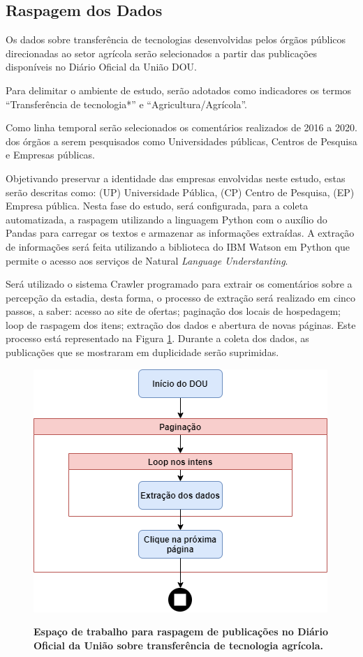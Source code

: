 \subsection{Raspagem dos Dados}

Os dados sobre transferência de tecnologias desenvolvidas pelos órgãos públicos direcionadas ao setor agrícola serão selecionados a partir das publicações disponíveis no Diário Oficial da União DOU.

Para delimitar o ambiente de estudo, serão adotados como indicadores os termos “Transferência de tecnologia*” e “Agricultura/Agrícola”. 

Como linha temporal serão selecionados os comentários realizados de 2016 a 2020. dos órgãos a serem pesquisados como Universidades públicas, Centros de Pesquisa e Empresas públicas.

Objetivando preservar a identidade das empresas envolvidas neste estudo, estas serão descritas como: (UP) Universidade Pública, (CP) Centro de Pesquisa, (EP) Empresa pública. Nesta fase do  estudo, será configurada, para a coleta automatizada, a raspagem utilizando a linguagem Python com o auxílio do Pandas para carregar os textos e armazenar as informações extraídas. A extração de informações será feita utilizando a biblioteca do IBM Watson em Python que permite o acesso aos serviços de Natural \textit{Language Understanting}.

Será utilizado o sistema Crawler programado para extrair os comentários sobre a percepção da estadia, desta forma, o processo de extração será realizado em cinco passos, a saber: acesso ao site de ofertas; paginação dos locais de hospedagem; loop de raspagem dos itens; extração dos dados e abertura de novas páginas. Este processo está representado  na Figura \ref{figura_raspagem}. Durante a coleta dos dados, as publicações que se mostraram em duplicidade serão suprimidas. 



\begin{figure}[H]
\centering
\caption{\textbf{Espaço de trabalho para raspagem de publicações no Diário Oficial da União sobre transferência de tecnologia agrícola.
}}
\includegraphics[scale=0.6]{Imagens/raspagem.png}
\label{figura_raspagem}
\end{figure}


